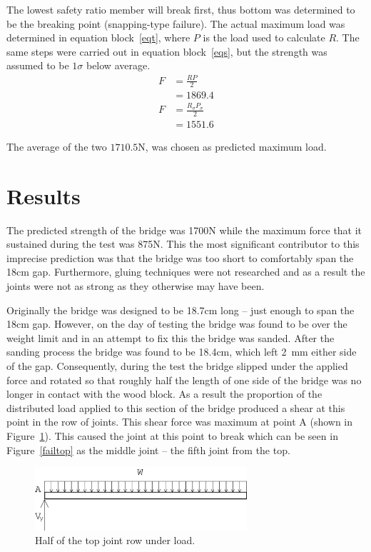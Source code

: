 \documentclass[12pt]{article}
\begin{document}
		The lowest safety ratio member will break first, thus bottom was determined to be the breaking point (snapping-type failure). The actual maximum load was determined in equation block~\ref{eqt}, where $P$ is the load used to calculate $R$. The same steps were carried out in equation block~\ref{eqs}, but the strength was assumed to be $1\sigma$ below average.
		\begin{subequations}
			\begin{align}
				F&=\frac{R P}{2} \\
				&=1869.4
			\end{align}
			\label{eqt}
		\end{subequations}
		\begin{subequations}
			\begin{align}
				F&=\frac{R_{\sigma} P_{\sigma}}{2} \\
				&=1551.6
			\end{align}
			\label{eqs}
		\end{subequations}

		The average of the two $1710.5\mathrm{N}$, was chosen as predicted maximum load.
	\section{Results}
The predicted strength of the bridge was 1700N while the maximum force that it sustained during the test was 875N. This the most significant contributor to this imprecise prediction was that the bridge was too short to comfortably span the 18cm gap. Furthermore, gluing techniques were not researched and as a result the joints were not as strong as they otherwise may have been.

Originally the bridge was designed to be 18.7cm long – just enough to span the 18cm gap. However, on the day of testing the bridge was found to be over the weight limit and in an attempt to fix this the bridge was sanded. After the sanding process the bridge was found to be 18.4cm, which left 2~mm either side of the gap. Consequently, during the test the bridge slipped under the applied force and rotated so that roughly half the length of one side of the bridge was no longer in contact with the wood block. As a result the proportion of the distributed load applied to this section of the bridge produced a shear at this point in the row of joints. This shear force was maximum at point A (shown in Figure~\ref{loadtop}). This caused the joint at this point to break which can be seen in Figure~\ref{failtop} as the middle joint – the fifth joint from the top.
		\begin{figure}[h!]
			\centering
			\includegraphics[width=0.7\textwidth]{loadtop}
			\caption{Half of the top joint row under load.}
			\label{loadtop}
		\end{figure}
\end{document}
